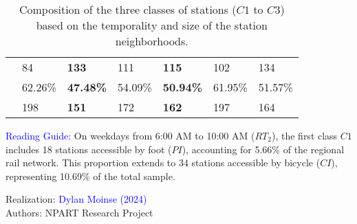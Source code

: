 \begin{table}[h!]
{\begin{tabular}{p{}p{}p{}p{}p{}p{}p{}}
& \small{84} & \textbf{\small{133}} & \small{111} & \textbf{\small{115}} & \small{102} & \small{134}\\
        \hdashline
\multirow{2}{*}{\small{Class 3 (\(C3\))}} & \small{62.26\%} & \textbf{\small{47.48\%}} & \small{54.09\%} & \textbf{\small{50.94\%}} & \small{61.95\%} & \small{51.57\%}\\
& \small{198} & \textbf{\small{151}} & \small{172} & \textbf{\small{162}} & \small{197} & \small{164}\\
        \hline
        \end{tabular}}
    \caption{Composition of the three classes of stations (\(C1\) to \(C3\)) based on the temporality and size of the station neighborhoods.}
    \label{table-chap6:classification-periodes}
        \vspace{5pt}
        \begin{flushleft}\scriptsize{
        \textcolor{blue}{Reading Guide:} On weekdays from 6:00 AM to 10:00 AM (\(RT_{2}\)), the first class \(C1\) includes 18 stations accessible by foot (\(PI\)), accounting for 5.66\% of the regional rail network. This proportion extends to 34 stations accessible by bicycle (\(CI\)), representing 10.69\% of the total sample.
        }\end{flushleft}
        \begin{flushright}\scriptsize{
        Realization: \textcolor{blue}{Dylan Moinse (2024)}
        \\
        Authors: \acrshort{NPART} Research Project
        }\end{flushright}
        \end{table}